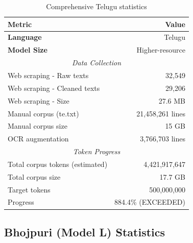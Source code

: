 \documentclass[11pt,a4paper]{article}
\begin{document}
\begin{table}[H]
    \centering
    \small
    \begin{tabular}{|l|r|}
    \hline
    \textbf{Metric} & \textbf{Value} \\
    \hline
    \textbf{Language} & Telugu \\
    \textbf{Model Size} & Higher-resource \\
    \hline
    \multicolumn{2}{|c|}{\textit{Data Collection}} \\
    \hline
    Web scraping - Raw texts & 32,549 \\
    Web scraping - Cleaned texts & 29,206 \\
    Web scraping - Size & 27.6 MB \\
    \hline
    Manual corpus (te.txt) & 21,458,261 lines \\
    Manual corpus size & 15 GB \\
    \hline
    OCR augmentation & 3,766,703 lines \\
    \hline
    \multicolumn{2}{|c|}{\textit{Token Progress}} \\
    \hline
    Total corpus tokens (estimated) & 4,421,917,647 \\
    Total corpus size & 17.7 GB \\
    Target tokens & 500,000,000 \\
    Progress & 884.4\% (EXCEEDED) \\
    \hline
    \end{tabular}
    \caption{Comprehensive Telugu statistics}
    \label{tab:stats_telugu}
\end{table}

\subsection{Bhojpuri (Model L) Statistics}
\end{document}
